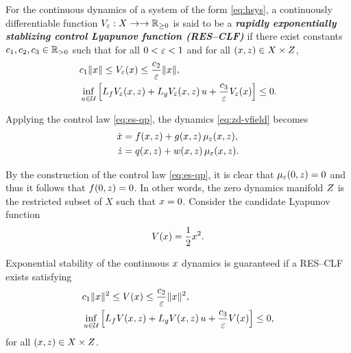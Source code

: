 \documentclass[twocolumn]{article}
\begin{document}
\begin{definition}
  For the continuous dynamics of a system of the form \eqref{eq:hsys}, a continuously differentiable function $V_{\varepsilon} : X \to \to \mathbb{R}_{\geq 0}$ is said to be a {\bf \em rapidly exponentially stablizing control Lyapunov function (RES--CLF)} if there exist constants $c_{1}, c_{2}, c_{3} \in \mathbb{R}_{> 0}$ such that for all $0 < \varepsilon < 1$ and for all $(x, z) \in X \times Z$,
  \begin{align}
    &c_{1} \| x \| \leq V_{\varepsilon}(x) \leq \frac{c_{2}}{\varepsilon} \| x \|,\\
    \nonumber
    &\inf_{u \in \mathcal{U}} \left[ L_{f} V_{\varepsilon}(x, z) + L_{g} V_{\varepsilon}(x, z) \, u + \frac{c_{3}}{\varepsilon} V_{\varepsilon}(x) \right] \leq 0.
  \end{align}
\end{definition}


Applying the control law \eqref{eq:es-qp}, the dynamics \eqref{eq:zd-vfield} becomes
\begin{align}
  \nonumber
  \dot {x} &= f(x, z) + g(x, z) \, \mu_{\varepsilon}(x, z),\\
  \dot {z} &= q(x, z) + w(x, z) \, \mu_{\varepsilon}(x, z).
  \label{eq:zd-vfield-cl}
\end{align}

By the construction of the control law \eqref{eq:es-qp}, it is clear that $\mu_{\varepsilon}(0, z) = 0$ and thus it follows that $f(0, z) = 0$.
%
In other words, the zero dynamics manifold $Z$ is the restricted subset of $X$ such that $x = 0$.
%
Consider the candidate Lyapunov function
\begin{align}
  V(x) = \frac{1}{2} x^{2}.
\end{align}

\begin{proposition}  
  Exponential stability of the continuous $x$ dynamics is guaranteed if a RES--CLF exists satisfying
  \begin{align}
    \label{eq:lyap-cond-nrg-es}
    &c_{1} \| x \|^{2} \leq V(x) \leq \frac{c_{2}}{\varepsilon} \| x \|^2,\\
    \nonumber
    &\inf_{u \in \mathcal{U}} \left[ L_{f} V(x, z) + L_{g} V(x, z) \, u + \frac{c_{3}}{\varepsilon} V(x) \right] \leq 0,
  \end{align}
  for all $(x, z) \in X \times Z$.
\end{proposition}
\end{document}
